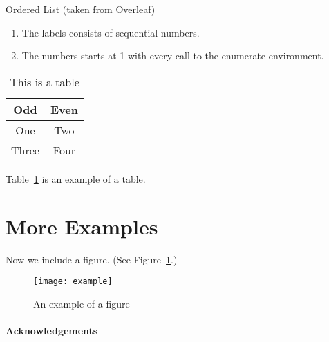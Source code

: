 \documentclass[a4paper]{article}
\theoremstyle{plain}
\theoremstyle{definition}
\begin{document}
	Ordered List (taken from Overleaf)
	\begin{enumerate}
		\item The labels consists of sequential numbers.
		\item The numbers starts at 1 with every call to the enumerate environment.
	\end{enumerate}

	\begin{table}[ht]
		\centering
		\begin{tabular}{|c|c|}
			\hline
			\textbf{Odd} & \textbf{Even} \\
			\hline\hline
			One & Two \\
			\hline
			Three & Four \\
			\hline
		\end{tabular}
		\caption{This is a table}
		\label{tbl:1}
	\end{table}

	Table~\ref*{tbl:1} is an example of a table.
	
	\section{More Examples}
	\label{sec:examples}
	
	Now we include a figure.
	(See Figure~\ref{fig:example}.)
	\begin{figure}[ht]
		\centering
		\texttt{[image: example]}
		\caption{An example of a figure}
		\label{fig:example}
	\end{figure}
	
	\paragraph{Acknowledgements} \lipsum[6]
	
	
		
\end{document}
